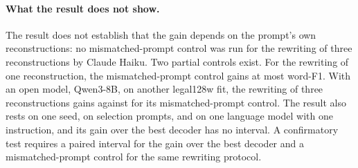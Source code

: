 \paragraph{What the result does not show.} The result does not establish that the gain depends on the prompt's own reconstructions: no mismatched-prompt control was run for the rewriting of three reconstructions by Claude Haiku.
Two partial controls exist.
For the rewriting of one reconstruction, the mismatched-prompt control gains at most  word-F1. %
With an open model, Qwen3-8B, on another legal128w fit, the rewriting of three reconstructions gains  against  for its mismatched-prompt control. %
The result also rests on one seed, on selection prompts, and on one language model with one instruction, and its gain over the best decoder has no interval.
A confirmatory test requires a paired interval for the gain over the best decoder and a mismatched-prompt control for the same rewriting protocol.
